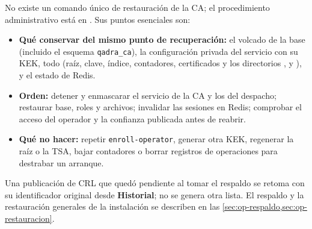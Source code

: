 No existe un comando único de restauración de la CA; el procedimiento
administrativo está en . Sus puntos esenciales
son:

\begin{itemize}
  \item \textbf{Qué conservar del mismo punto de recuperación:} el volcado de
        la base (incluido el esquema \texttt{qadra\_ca}), la configuración
        privada del servicio con su KEK, todo  (raíz, clave,
        índice, contadores, certificados y los directorios
        ,  y
        ),  y el estado de Redis.
  \item \textbf{Orden:} detener y enmascarar el servicio de la CA y los del
        despacho; restaurar base, roles y archivos; invalidar las sesiones en
        Redis; comprobar el acceso del operador y la confianza publicada
        antes de reabrir.
  \item \textbf{Qué no hacer:} repetir \texttt{enroll-operator}, generar otra
        KEK, regenerar la raíz o la TSA, bajar contadores o borrar registros
        de operaciones para destrabar un arranque.
\end{itemize}

Una publicación de CRL que quedó pendiente al tomar el respaldo se retoma
con su identificador original desde \textbf{Historial}; no se genera otra
lista. El respaldo y la restauración generales de la instalación se
describen en las \cref{sec:op-respaldo,sec:op-restauracion}.
